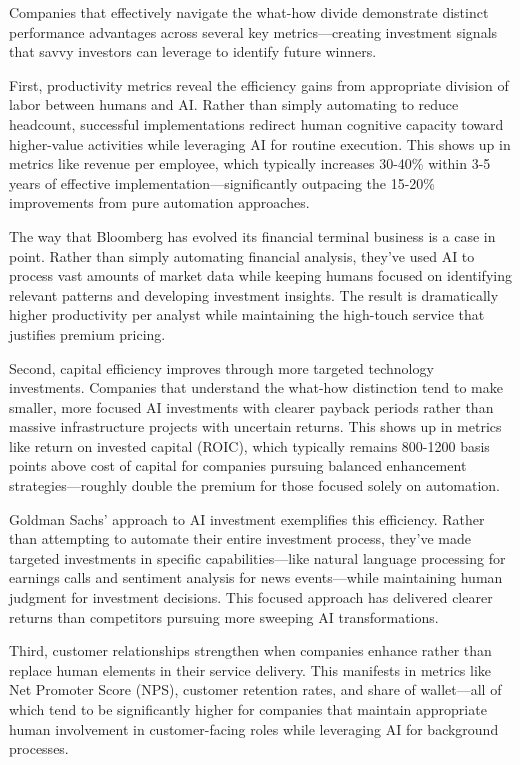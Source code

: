 \documentclass[
  Letterpaper,
]{scrbook}
\begin{document}
Companies that effectively navigate the what-how divide demonstrate
distinct performance advantages across several key metrics---creating
investment signals that savvy investors can leverage to identify future
winners.

First, productivity metrics reveal the efficiency gains from appropriate
division of labor between humans and AI. Rather than simply automating
to reduce headcount, successful implementations redirect human cognitive
capacity toward higher-value activities while leveraging AI for routine
execution. This shows up in metrics like revenue per employee, which
typically increases 30-40\% within 3-5 years of effective
implementation---significantly outpacing the 15-20\% improvements from
pure automation approaches.

The way that Bloomberg has evolved its financial terminal business is a
case in point. Rather than simply automating financial analysis, they've
used AI to process vast amounts of market data while keeping humans
focused on identifying relevant patterns and developing investment
insights. The result is dramatically higher productivity per analyst
while maintaining the high-touch service that justifies premium pricing.

Second, capital efficiency improves through more targeted technology
investments. Companies that understand the what-how distinction tend to
make smaller, more focused AI investments with clearer payback periods
rather than massive infrastructure projects with uncertain returns. This
shows up in metrics like return on invested capital (ROIC), which
typically remains 800-1200 basis points above cost of capital for
companies pursuing balanced enhancement strategies---roughly double the
premium for those focused solely on automation.

Goldman Sachs' approach to AI investment exemplifies this efficiency.
Rather than attempting to automate their entire investment process,
they've made targeted investments in specific capabilities---like
natural language processing for earnings calls and sentiment analysis
for news events---while maintaining human judgment for investment
decisions. This focused approach has delivered clearer returns than
competitors pursuing more sweeping AI transformations.

Third, customer relationships strengthen when companies enhance rather
than replace human elements in their service delivery. This manifests in
metrics like Net Promoter Score (NPS), customer retention rates, and
share of wallet---all of which tend to be significantly higher for
companies that maintain appropriate human involvement in customer-facing
roles while leveraging AI for background processes.
\end{document}
